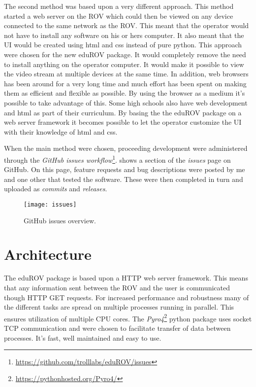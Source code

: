 The second method was based upon a very different approach. This method started a web server on the ROV which could then be viewed on any device connected to the same network as the ROV. This meant that the operator would not have to install any software on his or hers computer. It also meant that the UI would be created using html and css instead of pure python. This approach were chosen for the new eduROV package. It would completely remove the need to install anything on the operator computer. It would make it possible to view the video stream at multiple devices at the same time. In addition, web browsers has been around for a very long time and much effort has been spent on making them as efficient and flexible as possible. By using the browser as a medium it's possible to take advantage of this. Some high schools also have web development and html as part of their curriculum. By basing the the eduROV package on a web server framework it becomes possible to let the operator customize the UI with their knowledge of html and css.

When the main method were chosen, proceeding development were administered through the \emph{GitHub issues workflow}\footnote{\url{https://github.com/trolllabs/eduROV/issues}}.  shows a section of the \emph{issues} page on GitHub. On this page, feature requests and bug descriptions were posted by me and one other that tested the software. These were then completed in turn and uploaded as \textit{commits} and \textit{releases}.

\begin{figure}[h!]
    \centering
    \texttt{[image: issues]}
    \caption{GitHub issues overview.}
    \label{issues}
\end{figure}

\section{Architecture}

The eduROV package is based upon a HTTP web server framework. This means that any information sent between the ROV and the user is communicated though HTTP GET requests. For increased performance and robustness many of the different tasks are spread on multiple processes running in parallel. This ensures utilization of multiple CPU cores. The \emph{Pyro4}\footnote{\url{https://pythonhosted.org/Pyro4/}} python package uses socket TCP communication and were chosen to facilitate transfer of data between processes. It's fast, well maintained and easy to use.

